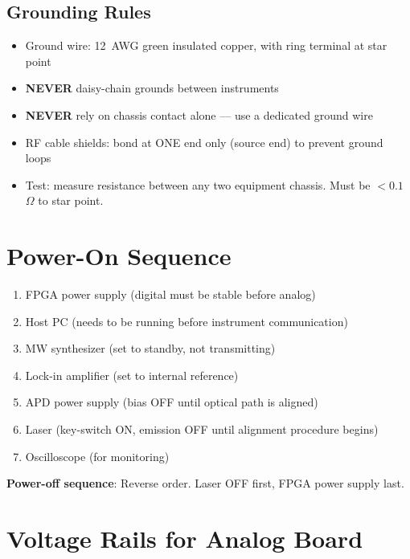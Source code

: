 \documentclass[11pt,a4paper,openany]{book}
\begin{document}
\subsection{Grounding Rules}

\begin{itemize}[nosep]
  \item Ground wire: 12~AWG green insulated copper, with ring terminal at star point
  \item \textbf{NEVER} daisy-chain grounds between instruments
  \item \textbf{NEVER} rely on chassis contact alone --- use a dedicated ground wire
  \item RF cable shields: bond at ONE end only (source end) to prevent ground loops
  \item Test: measure resistance between any two equipment chassis. Must be $< 0.1$~$\Omega$ to star point.
\end{itemize}

\section{Power-On Sequence}

\begin{enumerate}[nosep]
  \item FPGA power supply (digital must be stable before analog)
  \item Host PC (needs to be running before instrument communication)
  \item MW synthesizer (set to standby, not transmitting)
  \item Lock-in amplifier (set to internal reference)
  \item APD power supply (bias OFF until optical path is aligned)
  \item Laser (key-switch ON, emission OFF until alignment procedure begins)
  \item Oscilloscope (for monitoring)
\end{enumerate}

\noindent
\textbf{Power-off sequence}: Reverse order. Laser OFF first, FPGA power supply last.

\section{Voltage Rails for Analog Board}
\end{document}
